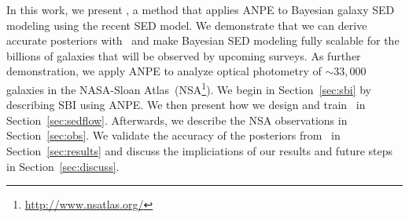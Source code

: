 
In this work, we present \sedflow, a method that applies ANPE to Bayesian
galaxy SED modeling using the recent \cite{hahn2022} SED model. 
We demonstrate that we can derive accurate posteriors with \sedflow~and make
Bayesian SED modeling fully scalable for the billions of galaxies that will be
observed by upcoming surveys.
As further demonstration, we apply ANPE to analyze optical photometry of
${\sim}33,000$ galaxies in the NASA-Sloan
Atlas~(NSA\footnote{\url{http://www.nsatlas.org/}}). 
We begin in Section~\ref{sec:sbi} by describing SBI using ANPE.
We then present how we design and train \sedflow~in Section~\ref{sec:sedflow}.
Afterwards, we describe the NSA observations in Section~\ref{sec:obs}. 
We validate the accuracy of the posteriors from \sedflow~in
Section~\ref{sec:results} and discuss the impliciations of our results and
future steps in Section~\ref{sec:discuss}. 

